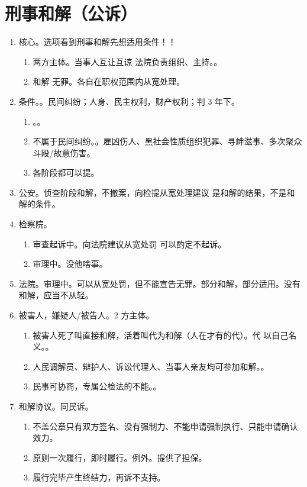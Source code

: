 \section{刑事和解（公诉）}
\begin{enumerate}
  \item 核心。选项看到刑事和解先想适用条件！！
        \begin{enumerate}
          \item 两方主体。当事人互让互谅 \yjt 法院负责组织、主持。。
          \item 和解 \bdy 无罪。各自在职权范围内从宽处理。
        \end{enumerate}
  \item 条件。。民间纠纷；人身、民主权利，财产权利；判 3 年下。
        \begin{enumerate}
          \item {}。。
          \item 不属于民间纠纷。。雇凶伤人、黑社会性质组织犯罪、寻衅滋事、多次聚众斗殴/故意伤害。
          \item 各阶段都可以提。
        \end{enumerate}
  \item 公安。侦查阶段和解，不撤案，向检提从宽处理建议 \yjt 是和解的结果，不是和解的条件。
  \item 检察院。
        \begin{enumerate}
          \item 审查起诉中。向法院建议从宽处罚 \hz 可以酌定不起诉。
          \item 审理中。没他啥事。
        \end{enumerate}
  \item 法院。审理中。\yi 可以从宽处罚，但不能宣告无罪。\er 部分和解，部分适用。\san 没有和解，应当不从轻。
  \item 被害人，嫌疑人/被告人。2 方主体。
        \begin{enumerate}
          \item 被害人死了叫直接和解，活着叫代为和解（人在才有的代）。代 \bdy 以自己名义。。
          \item 人民调解员、辩护人、诉讼代理人、当事人亲友均可参加和解。。
          \item 民事可协商，专属公检法的不能。。
        \end{enumerate}
  \item 和解协议。同民诉。
        \begin{enumerate}
          \item 不盖公章只有双方签名、没有强制力、不能申请强制执行、只能申请确认效力。
          \item 原则一次履行，即时履行。例外。提供了担保。
          \item 履行完毕产生终结力，再诉不支持。
        \end{enumerate}
\end{enumerate}
